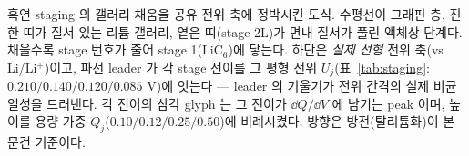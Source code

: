 \caption{흑연 staging 의 갤러리 채움을 공유 전위 축에 정박시킨 도식. 수평선이 그래핀 층, 진한 띠가 질서
있는 리튬 갤러리, 옅은 띠(stage 2L)가 면내 질서가 풀린 액체상 단계다. 채울수록 stage 번호가 줄어 stage
1($\mathrm{LiC_6}$)에 닿는다. 하단은 \emph{실제 선형} 전위 축(vs Li/Li$^+$)이고, 파선 leader 가 각 stage 전이를
그 평형 전위 $U_j$(표~\ref{tab:staging}: $0.210/0.140/0.120/0.085$ V)에 잇는다 --- leader 의 기울기가 전위 간격의
실제 비균일성을 드러낸다. 각 전이의 삼각 glyph 는 그 전이가 $\dd Q/\dd V$ 에 남기는 peak 이며, 높이를 용량
가중 $Q_j$($0.10/0.12/0.25/0.50$)에 비례시켰다. 방향은 방전(탈리튬화)이 본 문건 기준이다.}
\label{fig:staging}
